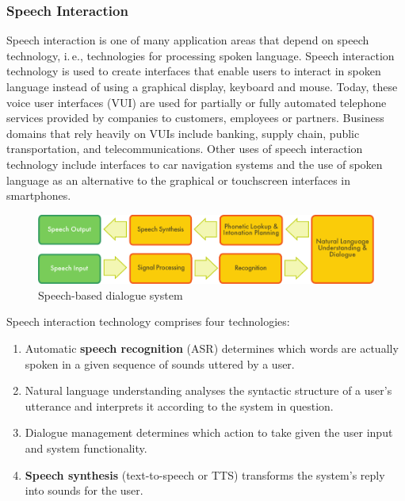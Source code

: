 \begin{multicols}{2}
\subsubsection{Speech Interaction}

Speech interaction is one of many application areas that depend on speech technology, i.\,e., technologies for processing spoken language. Speech interaction technology is used to create interfaces that enable users to interact in spoken language instead of using a graphical display, keyboard and mouse.  Today, these voice user interfaces (VUI) are used for partially or fully automated telephone services provided by companies to customers, employees or partners. Business domains that rely heavily on VUIs include banking, supply chain, public transportation, and telecommunications. Other uses of speech interaction technology include interfaces to car navigation systems and the use of spoken language as an alternative to the graphical or touchscreen interfaces in smartphones.

\begin{figure}[htb]
  \center
  \includegraphics[width=\textwidth]{../_media/english/simple_speech-based_dialogue_architecture}
  \caption{Speech-based dialogue system}
  \label{fig:dialoguearch_en}
\end{figure}

Speech interaction technology comprises four technologies: 

\begin{enumerate}
\item Automatic \textbf{speech recognition} (ASR) determines which words are actually spoken in a given sequence of sounds uttered by a user.  
\item Natural language understanding analyses the syntactic structure of a user’s utterance and interprets it according to the system in question.
\item Dialogue management determines which action to take given the user input and system functionality.   
\item \textbf{Speech synthesis} (text-to-speech or TTS) transforms the system’s reply into sounds for the user.
\end{enumerate}


\end{multicols}
